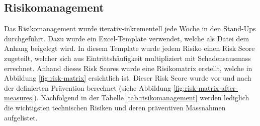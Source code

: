 \subsection{Risikomanagement}
\label{sec:risikomanagement}
Das Risikomanagement wurde iterativ-inkrementell jede Woche in den Stand-Ups durchgeführt. Dazu wurde ein Excel-Template verwendet, welche als Datei dem Anhang beigelegt wird. In diesem Template wurde jedem Risiko einen Risk Score zugeteilt, welcher sich aus Eintrittshäufigkeit multipliziert mit Schadensausmass errechnet. Anhand dieses Risk Scores wurde eine Risikomatrix erstellt, welche in Abbildung \ref{fig:risk-matrix} ersichtlich ist. Dieser Risk Score wurde vor und nach der definierten Prävention berechnet (siehe Abbildung \ref{fig:risk-matrix-after-measures}). Nachfolgend in der Tabelle \ref{tab:risikomanagement} werden lediglich die wichtigsten technischen Risiken und deren präventiven Massnahmen aufgelistet. 

